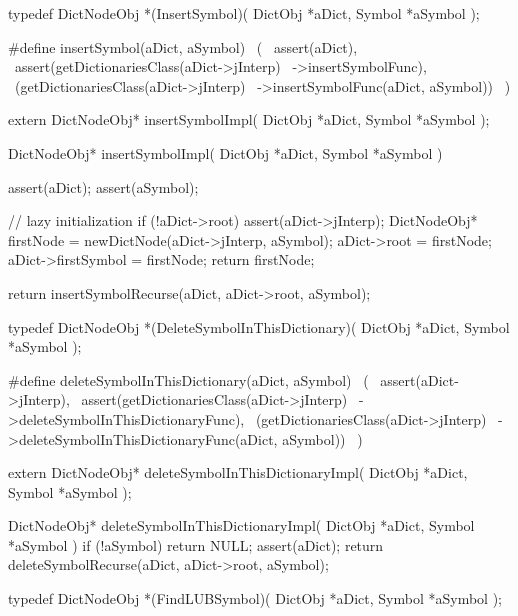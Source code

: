 \startTestSuite[insertSymbol]

\startCHeader
typedef DictNodeObj *(InsertSymbol)(
  DictObj *aDict,
  Symbol  *aSymbol
);

#define insertSymbol(aDict, aSymbol)            \
  (                                             \
    assert(aDict),                              \
    assert(getDictionariesClass(aDict->jInterp) \
      ->insertSymbolFunc),                      \
    (getDictionariesClass(aDict->jInterp)       \
      ->insertSymbolFunc(aDict, aSymbol))       \
  )
\stopCHeader

\setCHeaderStream{private}
\startCHeader
extern DictNodeObj* insertSymbolImpl(
  DictObj *aDict,
  Symbol  *aSymbol
);
\stopCHeader
\setCHeaderStream{public}

\startCCode
DictNodeObj* insertSymbolImpl(
  DictObj *aDict,
  Symbol  *aSymbol
) {
  assert(aDict);
  assert(aSymbol);

  // lazy initialization
  if (!aDict->root) {
    assert(aDict->jInterp);
    DictNodeObj* firstNode = newDictNode(aDict->jInterp, aSymbol);
    aDict->root            = firstNode;
    aDict->firstSymbol     = firstNode;
    return firstNode;
  }

  return insertSymbolRecurse(aDict, aDict->root, aSymbol);
}
\stopCCode
\stopTestSuite

\startTestSuite[deleteSymbolInThisDictionary]

\startCHeader
typedef DictNodeObj *(DeleteSymbolInThisDictionary)(
  DictObj *aDict,
  Symbol  *aSymbol
);

#define deleteSymbolInThisDictionary(aDict, aSymbol)      \
  (                                                       \
    assert(aDict->jInterp),                               \
    assert(getDictionariesClass(aDict->jInterp)           \
      ->deleteSymbolInThisDictionaryFunc),                \
    (getDictionariesClass(aDict->jInterp)                 \
      ->deleteSymbolInThisDictionaryFunc(aDict, aSymbol)) \
  )
\stopCHeader

\startCHeader
extern DictNodeObj* deleteSymbolInThisDictionaryImpl(
  DictObj *aDict,
  Symbol  *aSymbol
);
\stopCHeader
\setCHeaderStream{public}

\startCCode
DictNodeObj* deleteSymbolInThisDictionaryImpl(
  DictObj *aDict,
  Symbol  *aSymbol
) {
  if (!aSymbol) return NULL;
  assert(aDict);
  return deleteSymbolRecurse(aDict, aDict->root, aSymbol);
}
\stopCCode
\stopTestSuite

\startTestSuite[findLUBSymbol]
\startCHeader
typedef DictNodeObj *(FindLUBSymbol)(
  DictObj *aDict,
  Symbol  *aSymbol
);

